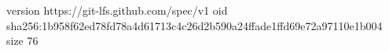 version https://git-lfs.github.com/spec/v1
oid sha256:1b958f62ed78fd78a4d61713c4c26d2b590a24ffade1ffd69e72a97110e1b004
size 76
